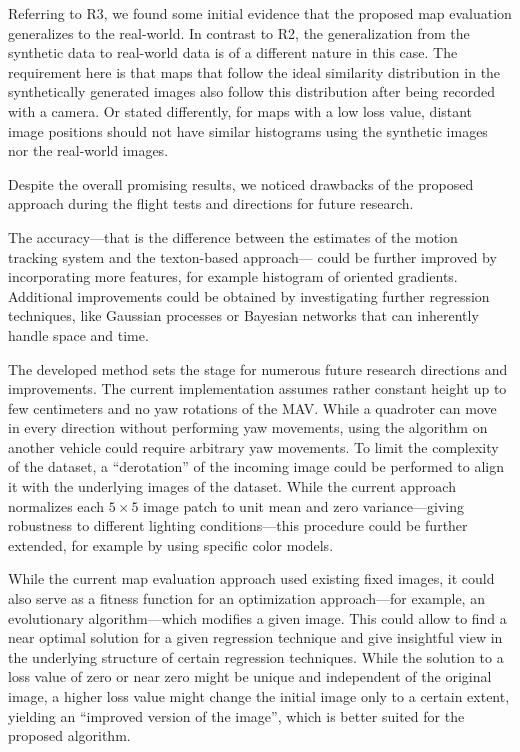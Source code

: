 Referring to R3, we found some initial evidence that the proposed map
evaluation generalizes to the real-world. In contrast to R2, the
generalization from the synthetic data to real-world data is of a
different nature in this case. The requirement here is that maps that
follow the ideal similarity distribution in the synthetically
generated images also follow this distribution after being recorded
with a camera. Or stated differently, for maps with a low loss value,
distant image positions should not have similar histograms using the
synthetic images nor the real-world images.

Despite the overall promising results, we noticed drawbacks of the
proposed approach during the flight tests and directions for future
research.

The accuracy---that is the difference between the estimates of the
motion tracking system and the texton-based approach--- could be
further improved by incorporating more features, for example histogram
of oriented gradients. Additional improvements could be obtained by
investigating further regression techniques, like Gaussian processes
or Bayesian networks that can inherently handle space and time.

The developed method sets the stage for numerous future research
directions and improvements. The current implementation assumes rather
constant height up to few centimeters and no yaw rotations of the
MAV. While a quadroter can move in every direction without performing
yaw movements, using the algorithm on another vehicle could require
arbitrary yaw movements. To limit the complexity of the dataset, a
``derotation'' of the incoming image could be performed to align it
with the underlying images of the dataset. While the current approach
normalizes each $5\times5$ image patch to unit mean and zero
variance---giving robustness to different lighting conditions---this
procedure could be further extended, for example by using specific
color models.

While the current map evaluation approach used existing fixed images,
it could also serve as a fitness function for an optimization
approach---for example, an evolutionary algorithm---which modifies a
given image. This could allow to find a near optimal solution for a
given regression technique and give insightful view in the underlying
structure of certain regression techniques. While the solution to a
loss value of zero or near zero might be unique and independent of the
original image, a higher loss value might change the initial image
only to a certain extent, yielding an ``improved version of the
image'', which is better suited for the proposed algorithm.


